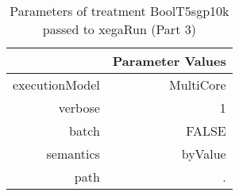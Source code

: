 \begin{table}[ht]
\centering
\begin{tabular}{rr}
  \hline
 & Parameter Values \\ 
  \hline
executionModel & MultiCore \\ 
  verbose & 1 \\ 
  batch & FALSE \\ 
  semantics & byValue \\ 
  path & . \\ 
   \hline
\end{tabular}
\caption{ Parameters of treatment BoolT5sgp10k passed to xegaRun
 (Part 3)} 
\end{table}
